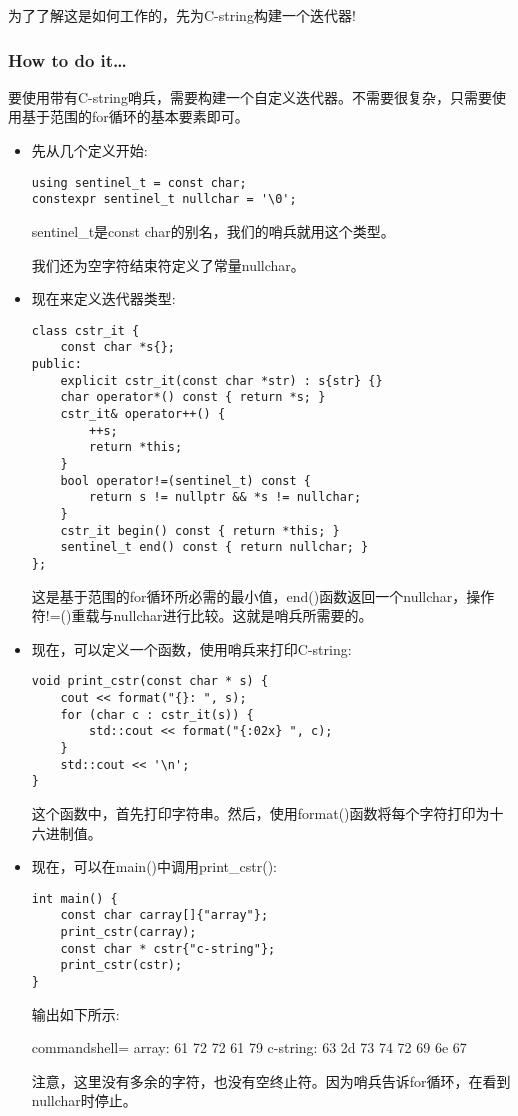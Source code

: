 为了了解这是如何工作的，先为C-string构建一个迭代器!

\subsubsection{How to do it…}

要使用带有C-string哨兵，需要构建一个自定义迭代器。不需要很复杂，只需要使用基于范围的for循环的基本要素即可。

\begin{itemize}
\item 
先从几个定义开始:

\begin{lstlisting}[style=styleCXX]
using sentinel_t = const char;
constexpr sentinel_t nullchar = '\0';
\end{lstlisting}

sentinel\_t是const char的别名，我们的哨兵就用这个类型。

我们还为空字符结束符定义了常量nullchar。

\item 
现在来定义迭代器类型:

\begin{lstlisting}[style=styleCXX]
class cstr_it {
	const char *s{};
public:
	explicit cstr_it(const char *str) : s{str} {}
	char operator*() const { return *s; }
	cstr_it& operator++() {
		++s;
		return *this;
	}
	bool operator!=(sentinel_t) const {
		return s != nullptr && *s != nullchar;
	}
	cstr_it begin() const { return *this; }
	sentinel_t end() const { return nullchar; }
};
\end{lstlisting}

这是基于范围的for循环所必需的最小值，end()函数返回一个nullchar，操作符!=()重载与nullchar进行比较。这就是哨兵所需要的。

\item 
现在，可以定义一个函数，使用哨兵来打印C-string:

\begin{lstlisting}[style=styleCXX]
void print_cstr(const char * s) {
	cout << format("{}: ", s);
	for (char c : cstr_it(s)) {
		std::cout << format("{:02x} ", c);
	}
	std::cout << '\n';
}
\end{lstlisting}

这个函数中，首先打印字符串。然后，使用format()函数将每个字符打印为十六进制值。

\item 
现在，可以在main()中调用print\_cstr():

\begin{lstlisting}[style=styleCXX]
int main() {
	const char carray[]{"array"};
	print_cstr(carray);
	const char * cstr{"c-string"};
	print_cstr(cstr);
}
\end{lstlisting}

输出如下所示:

\begin{tcblisting}{commandshell={}}
array: 61 72 72 61 79
c-string: 63 2d 73 74 72 69 6e 67
\end{tcblisting}

注意，这里没有多余的字符，也没有空终止符。因为哨兵告诉for循环，在看到nullchar时停止。

\end{itemize}

